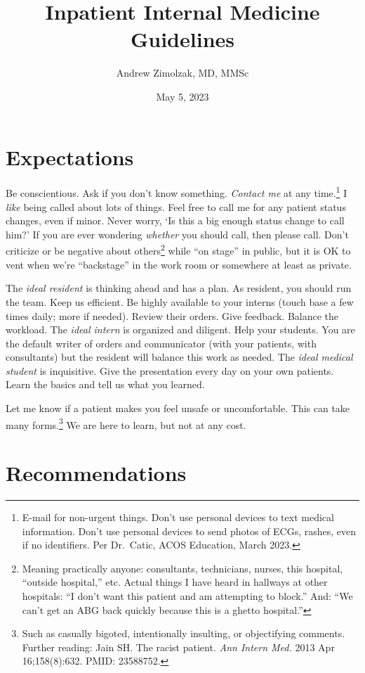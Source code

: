 \documentclass{tufte-handout}
\title{Inpatient Internal Medicine Guidelines}
\author{Andrew Zimolzak, MD, MMSc}
\date{May 5, 2023}
\begin{document}
\maketitle

\section{Expectations}

Be conscientious. Ask if you don't know something. \emph{Contact me} at any time.\footnote{E-mail for non-urgent things. Don't
use personal devices to text medical information. Don't use personal
devices to send photos of ECGs, rashes, even if no identifiers. Per
Dr.\ Catic, ACOS Education, March 2023.} I \emph{like} being called
about lots of things. Feel free to call me for any patient status
changes, even if minor. Never worry, `Is this a big enough status
change to call him?' If you are ever wondering \emph{whether} you
should call, then please call. Don't criticize or be negative about
others\footnote{Meaning practically anyone: consultants, technicians,
nurses, this hospital, ``outside hospital,'' etc. Actual things I have
heard in hallways at other hospitals: ``I don't want this patient and
am attempting to block.'' And: ``We can't get an ABG back quickly
because this is a ghetto hospital.''} while ``on stage'' in public,
but it is OK to vent when we're ``backstage'' in the work room or
somewhere at least as private.

The \emph{ideal resident} is thinking ahead and has a plan. As
resident, you should run the team. Keep us efficient. Be highly
available to your interns (touch base a few times daily; more if
needed). Review their orders. Give feedback. Balance the workload. The
\emph{ideal intern} is organized and diligent. Help your students. You
are the default writer of orders and communicator (with your patients,
with consultants) but the resident will balance this work as needed.
The \emph{ideal medical student} is inquisitive. Give the presentation
every day on your own patients. Learn the basics and tell us what you
learned.

Let me know if a patient makes you feel unsafe or uncomfortable. This
can take many forms.\footnote{Such as casually bigoted, intentionally insulting, or objectifying comments. Further reading: Jain SH. The racist
patient. \emph{Ann Intern Med.} 2013 Apr 16;158(8):632. PMID:
23588752.} We are here to learn, but not at any cost.



\section{Recommendations}
\end{document}
